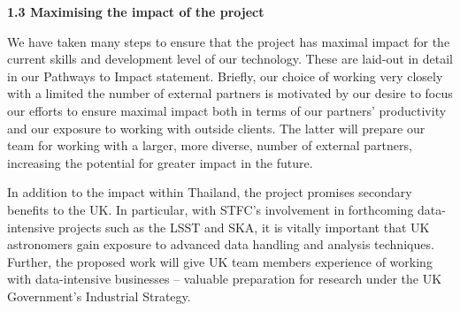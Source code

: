 \documentclass[11pt]{article}
\begin{document}
\vspace{3mm}
\noindent
{\large \bf 1.3 Maximising the impact of the project}

\noindent
We have taken many steps to ensure that the project has maximal impact for the current skills and development level of our technology. These are laid-out in detail in our Pathways to Impact statement. Briefly, our choice of working very closely with a limited the number of external partners is motivated by our desire to focus our efforts to ensure maximal impact both in terms of our partners' productivity and our exposure to working with outside clients. The latter will prepare our team for working with a larger, more diverse, number of external partners, increasing the potential for greater impact in the future.

\vspace{2mm}
\noindent
In addition to the impact within Thailand, the project promises secondary benefits to the UK. In particular, with STFC's involvement in forthcoming data-intensive projects such as the LSST and SKA, it is vitally important that UK astronomers gain exposure to advanced data handling and analysis techniques. Further, the proposed work will give UK team members experience of working with data-intensive businesses -- valuable preparation for research under the UK Government's Industrial Strategy.

\end{document}
